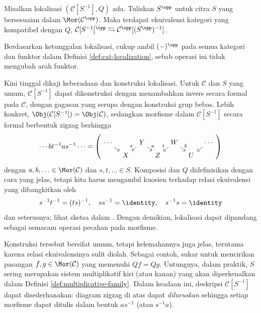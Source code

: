 \begin{proposisi}
	Misalkan lokalisasi $(\mathcal{C}[S^{-1}], Q)$ ada. Tuliskan $S^{\opp}$
	untuk citra $S$ yang bersesuaian dalam $\Mor(\mathcal{C}^{\opp})$. Maka
	terdapat ekuivalensi kategori yang kompatibel dengan $Q$,
	$\mathcal{C}[S^{-1}]^{\opp} \leftrightarrows
	\mathcal{C}^{\opp}[(S^{\opp})^{-1}]$.
\end{proposisi}
\begin{bukti}
	Berdasarkan ketunggalan lokalisasi, cukup ambil $(-)^{\opp}$ pada semua
	kategori dan funktor dalam Definisi \ref{def:cat-localization}, sebab
	operasi ini tidak mengubah arah funktor.
\end{bukti}

Kini tinggal dikaji keberadaan dan konstruksi lokalisasi. Untuk
$\mathcal{C}$ dan $S$ yang umum,
$\mathcal{C}[S^{-1}]$ dapat dikonstruksi dengan menambahkan invers secara
formal pada $\mathcal{C}$, dengan gagasan yang serupa dengan konstruksi grup
bebas. Lebih konkret,
$\Obj(\mathcal{C}[S^{-1}]) = \Obj(\mathcal{C})$, sedangkan morfisme dalam
$\mathcal{C}[S^{-1}]$ secara formal berbentuk zigzag berhingga
\[ \cdots b t^{-1} a s^{-1} \cdots = \left(
	\begin{tikzcd}[row sep=tiny, column sep=tiny]
	\cdots \arrow[rd] & & Y \arrow[ld, "s"'] \arrow[rd, "a"] & & W \arrow[ld, "t"'] \arrow[rd, "b"] & & \cdots \arrow[ld] \\
	& X & & Z & & U &
\end{tikzcd}\right) \]
dengan $a, b, \ldots \in \Mor(\mathcal{C})$ dan $s, t, \ldots \in S$.
Komposisi dan $Q$ didefinisikan dengan cara yang jelas, tetapi kita harus
mengambil kuosien terhadap relasi ekuivalensi yang dibangkitkan oleh
\[ s^{-1} t^{-1} = (ts)^{-1}, \quad s s^{-1} = \identity, \quad s^{-1} s = \identity \]
dan seterusnya; lihat sketsa dalam \cite[I.1.1]{GZ67}. Dengan demikian,
lokalisasi dapat dipandang sebagai semacam operasi pecahan pada morfisme.

Konstruksi tersebut bersifat umum, tetapi kelemahannya juga jelas, terutama
karena relasi ekuivalensinya sulit diolah. Sebagai contoh, sukar untuk
mencirikan pasangan $f, g \in \Mor(\mathcal{C})$ yang memenuhi $Qf = Qg$.
Untungnya, dalam praktik, $S$ sering merupakan sistem multiplikatif kiri
(atau kanan) yang akan diperkenalkan dalam Definisi
\ref{def:multiplicative-family}. Dalam keadaan ini, deskripsi
$\mathcal{C}[S^{-1}]$ dapat disederhanakan: diagram zigzag di atas dapat
\emph{diluruskan} sehingga setiap morfisme dapat ditulis dalam bentuk
$a s^{-1}$ (atau $s^{-1} a$).

